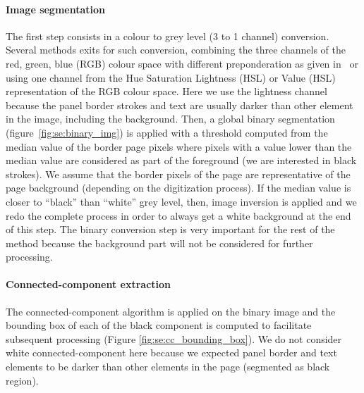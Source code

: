\paragraph{Image segmentation} %
\label{par:se:image_segmentation}

The first step consists in a colour to grey level (3 to 1 channel) conversion.
Several methods exits for such conversion, combining the three channels of the red, green, blue (RGB) colour space with different preponderation as given in~\cite{Pratt91} or using one channel from the Hue Saturation Lightness (HSL) or Value (HSL) representation of the RGB colour space.
Here we use the lightness channel because the panel border strokes and text are usually darker than other element in the image, including the background. 
Then, a global binary segmentation (figure~\ref{fig:se:binary_img}) is applied with a threshold computed from the median value of the border page pixels where pixels with a value lower than the median value are considered as part of the foreground (we are interested in black strokes).
We assume that the border pixels of the page are representative of the page background (depending on the digitization process).
If the median value is closer to ``black'' than ``white'' grey level, then, image inversion is applied and we redo the complete process in order to always get a white background at the end of this step.
The binary conversion step is very important for the rest of the method because the background part will not be considered for further processing. %


\paragraph{Connected-component extraction} %
 \label{par:connected_component_extraction}
 
The connected-component algorithm is applied on the binary image and the bounding box of each of the black component is computed to facilitate subsequent processing (Figure \ref{fig:se:cc_bounding_box}).
We do not consider white connected-component here because we expected panel border and text elements to be darker than other elements in the page (segmented as black region).


